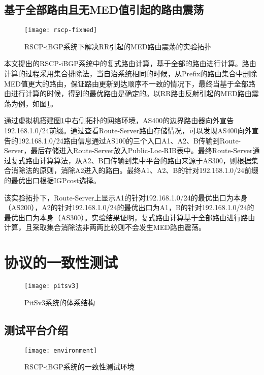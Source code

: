 \subsection{基于全部路由且无MED值引起的路由震荡}


\begin{figure}
  \centering
  \texttt{[image: rscp-fixmed]}
  \caption{RSCP-iBGP系统下解决RR引起的MED路由震荡的实验拓扑}
  \label{fig:rscp-fixmed}
\end{figure}


本文提出的RSCP-iBGP系统中的复式路由计算，基于全部的路由进行计算。路由计算的过程采用集合排除法，当自治系统相同的时候，从Prefix的路由集合中删除MED值更大的路由，保证路由更新到达顺序不一致的情况下，最终当基于全部路由进行计算的时候，得到的最优路由是确定的。以RR路由反射引起的MED路由震荡为例，如图\ref{fig:rscp-fixmed}。

通过虚拟机搭建图\ref{fig:rscp-fixmed}中右侧拓扑的网络环境，AS400的边界路由器向外宣告192.168.1.0/24前缀。通过查看Route-Server路由存储情况，可以发现AS400向外宣告的192.168.1.0/24路由信息通过AS100的三个入口A1、A2、B传输到Route-Server，最后存储进入Route-Server放入Public-Loc-RIB表中。最终Route-Server通过复式路由计算算法，从A2、B口传输到集中平台的路由来源于AS300，则根据集合消除法的原则，消除A2进入的路由。最终A1、A2、B的针对192.168.1.0/24前缀的最优出口根据IGPcost选择。

该实验拓扑下，Route-Server上显示A1的针对192.168.1.0/24的最优出口为本身（AS200），A2的针对192.168.1.0/24的最优出口为A1，B的针对192.168.1.0/24的最优出口为本身（AS300）。实验结果证明，复式路由计算基于全部路由进行路由计算，且采取集合消除法非两两比较则不会发生MED路由震荡。



\section{协议的一致性测试}

\begin{figure}
  \centering
  \texttt{[image: pitsv3]}
  \caption{PitSv3系统的体系结构\cite{journals_chinaf_YinWJS08}}
  \label{fig:pitsv3}
\end{figure}

\subsection{测试平台介绍}

\begin{figure}
  \centering
  \texttt{[image: environment]}
  \caption{RSCP-iBGP系统的一致性测试环境}
  \label{fig:environment}
\end{figure}

